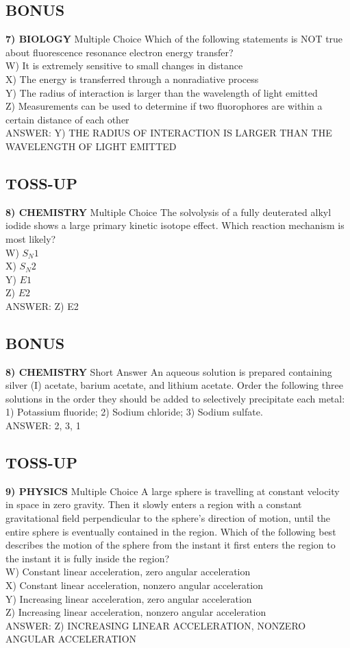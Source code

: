 \documentclass{article}
\begin{document}
\subsection*{BONUS}
\textbf{7) BIOLOGY} Multiple Choice Which of the following statements is NOT true about fluorescence resonance electron energy transfer?
\\W) It is extremely sensitive to small changes in distance
\\X) The energy is transferred through a nonradiative process
\\Y) The radius of interaction is larger than the wavelength of light emitted
\\Z) Measurements can be used to determine if two fluorophores are within a certain distance of each other
\\ANSWER: Y) THE RADIUS OF INTERACTION IS LARGER THAN THE WAVELENGTH OF LIGHT EMITTED

\subsection*{TOSS-UP}
\textbf{8) CHEMISTRY} Multiple Choice The solvolysis of a fully deuterated alkyl iodide shows a large primary kinetic isotope effect. Which reaction mechanism is most likely?
\\W) $S_N1$
\\X) $S_N2$
\\Y) $E1$
\\Z) $E2$
\\ANSWER: Z) E2

\subsection*{BONUS}
\textbf{8) CHEMISTRY} Short Answer An aqueous solution is prepared containing silver (I) acetate, barium acetate, and lithium acetate. Order the following three solutions in the order they should be added to selectively precipitate each metal: 1) Potassium fluoride; 2) Sodium chloride; 3) Sodium sulfate.
\\ANSWER: 2, 3, 1

\subsection*{TOSS-UP}
\textbf{9) PHYSICS} Multiple Choice A large sphere is travelling at constant velocity in space in zero gravity. Then it slowly enters a region with a constant gravitational field perpendicular to the sphere's direction of motion, until the entire sphere is eventually contained in the region. Which of the following best describes the motion of the sphere from the instant it first enters the region to the instant it is fully inside the region?
\\W) Constant linear acceleration, zero angular acceleration
\\X) Constant linear acceleration, nonzero angular acceleration
\\Y) Increasing linear acceleration, zero angular acceleration
\\Z) Increasing linear acceleration, nonzero angular acceleration
\\ANSWER: Z) INCREASING LINEAR ACCELERATION, NONZERO ANGULAR ACCELERATION
\end{document}
